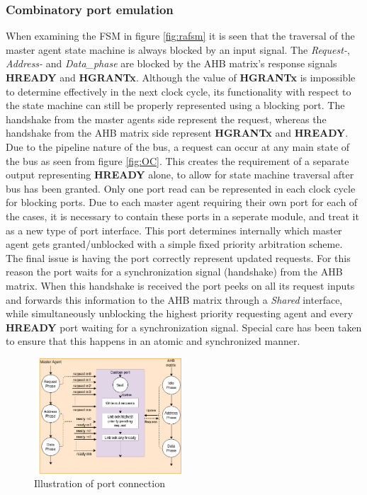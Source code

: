 \subsubsection{Combinatory port emulation}
When examining the FSM in figure \ref{fig:rafsm} it is seen that the traversal of the master agent state machine is always blocked by an input signal. The \textit{Request-}, \textit{Address-} and \textit{Data\_phase} are blocked by the AHB matrix's response signals \textbf{HREADY} and \textbf{HGRANTx}. Although the value of \textbf{HGRANTx} is impossible to determine effectively in the next clock cycle, its functionality with respect to the state machine can still be properly represented using a blocking port. The handshake from the master agents side represent the request, whereas the handshake from the AHB matrix side represent \textbf{HGRANTx} and \textbf{HREADY}. Due to the pipeline nature of the bus, a request can occur at any main state of the bus as seen from figure \ref{fig:OC}. This creates the requirement of a separate output representing \textbf{HREADY} alone, to allow for state machine traversal after bus has been granted. Only one port read can be represented in each clock cycle for blocking ports. Due to each master agent requiring their own port for each of the cases, it is necessary to contain these ports in a seperate module, and treat it as a new type of port interface.
This port determines internally which master agent gets granted/unblocked with a simple fixed priority arbitration scheme. The final issue is having the port correctly represent updated requests. For this reason the port waits for a synchronization signal (handshake) from the AHB matrix. When this handshake is received the port peeks on all its request inputs and forwards this information to the AHB matrix through a \textit{Shared} interface, while simultaneously unblocking the highest priority requesting agent and every \textbf{HREADY} port waiting for a synchronization signal. Special care has been taken to ensure that this happens in an atomic and synchronized manner.   
\begin{figure}
\includegraphics[width=5.5cm]{figs/ESL/port_diagram.png}
\caption{Illustration of port connection}\label{fig:cport}
\end{figure}

